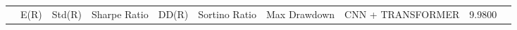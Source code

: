 \begin{tabular}{lrrrrrrrrr}
 & E(R) & Std(R) & Sharpe Ratio & DD(R) & Sortino Ratio & Max Drawdown & %
CNN + TRANSFORMER & 9.9800%
\end{tabular}
